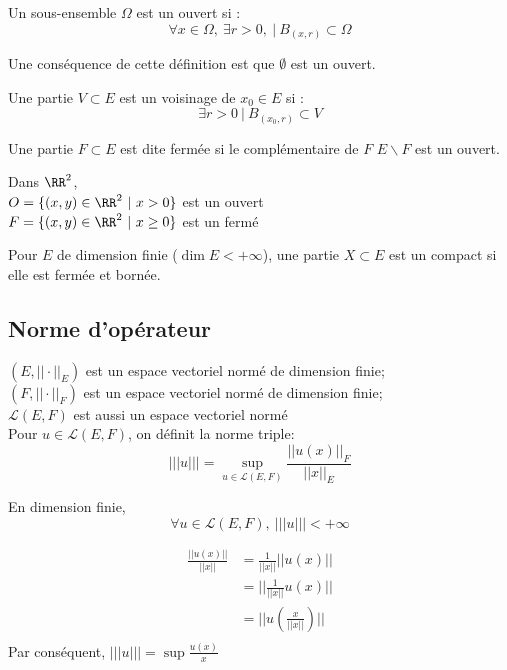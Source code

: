 \documentclass[../main.tex]{subfile}
\begin{document}
\begin{defi}
	Un sous-ensemble $\Omega$ est un ouvert si :
	$$\forall x \in \Omega, \ \exists r > 0, \ | \ B_{(x, r)} \subset \Omega$$
\end{defi}
\begin{rema}
	Une conséquence de cette définition est que $\emptyset$ est un ouvert.
\end{rema}

\begin{defi}
	Une partie $V \subset E$ est un voisinage de $x_0 \in E$ si : 
	$$\exists r > 0 \ | \ B_{(x_0, r)} \subset V$$
\end{defi}

\begin{defi}
	Une partie $F \subset E$ est dite fermée si le complémentaire de $F$ $E \backslash F$ est un ouvert.
\end{defi}

\begin{ex}
	Dans $\RR^2$, \\
	$O = \{(x, y) \in \RR^2 \ | \ x > 0\}$ est un ouvert\\
	$F = \{(x, y) \in \RR^2 \ | \ x \geq 0\}$ est un fermé\\
\end{ex}

\begin{defi}
	Pour $E$ de dimension finie ($\dim E < + \infty$), une partie $X \subset E$ est un compact si elle est fermée et bornée.
\end{defi}

\subsection{Norme d'opérateur}

$(E, ||\cdot||_E)$ est un espace vectoriel normé de dimension finie;\\
$(F, ||\cdot||_F)$ est un espace vectoriel normé de dimension finie;\\
$\mathcal{L}(E, F)$ est aussi un espace vectoriel normé\\
Pour $u \in \mathcal{L}(E, F)$, on définit la norme triple:
$$|||u||| = \sup\limits_{u \in \mathcal{L}(E, F)} \frac{||u(x)||_F}{||x||_E}$$

\begin{prop}
	En dimension finie, 
	$$\forall u \in \mathcal{L}(E, F), \ |||u||| < + \infty$$
\end{prop}

\begin{rema}
	$$
\begin{aligned}
	\frac{||u(x)||}{||x||} &= \frac{1}{||x||} ||u(x)||\\
	&= ||\frac{1}{||x||} u(x)||\\
	&= ||u(\frac{x}{||x||})||\\
\end{aligned}
	$$
	Par conséquent, $|||u||| = \sup \frac{u(x)}{x}$
\end{rema}
\end{document}
